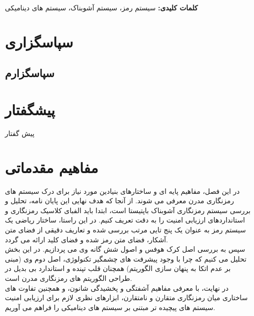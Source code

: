 \documentclass[12pt]{report}
\begin{document}
\vspace*{\fill}

\textbf{ کلمات کلیدی:  }
سیستم رمز،  سیستم آشوبناک، سیستم های دینامیکی


\newpage
\pagestyle{plain}
\setcounter{page}{1}

{
\hypersetup{linkcolor=ToC}
\tableofcontents
}

\newpage

\listoffigures

\chapter*{سپاسگزاری}
\section*{سپاسگزارم}

\chapter*{پیشگفتار }
پیش گفتار

\chapter{ مفاهیم مقدماتی  }
\setcounter{page}{1}

در این فصل، مفاهیم پایه ای و ساختارهای بنیادین مورد نیاز برای درک سیستم های رمزنگاری 
مدرن معرفی می شوند. از آنجا که هدف نهایی این پایان نامه، تحلیل و بررسی سیستم رمزنگاری 
آشوبناک باپتیستا است، ابتدا باید الفبای کلاسیک رمزنگاری و استانداردهای ارزیابی امنیت را 
به دقت تعریف کنیم. در این راستا، ساختار ریاضی یک سیستم رمز به عنوان یک پنج تایی مرتب 
بررسی شده و تعاریف دقیقی از فضای متن آشکار، فضای متن رمز شده و فضای کلید ارائه می گردد.
\\\noindent
سپس به بررسی اصل کرک هوفس و اصول شش گانه وی می پردازیم. در این بخش تحلیل می کنیم که چرا 
با وجود پیشرفت های چشمگیر تکنولوژی، اصل دوم وی (مبنی بر عدم اتکا به پنهان سازی الگوریتم) 
همچنان قلب تپنده و استاندارد بی بدیل در طراحی الگوریتم های رمزنگاری مدرن است. 
\\\noindent
در نهایت، با معرفی مفاهیم آشفتگی و پخشیدگی شانون، و همچنین تفاوت های ساختاری میان 
رمزنگاری متقارن و نامتقارن، ابزارهای نظری لازم برای ارزیابی امنیت سیستم های پیچیده تر 
مبتنی بر سیستم های دینامیکی را فراهم می آوریم.
\end{document}
